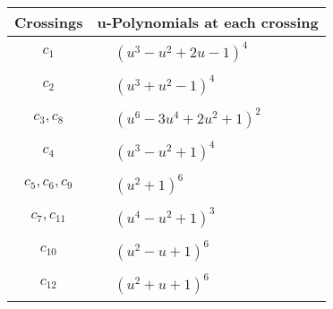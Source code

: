 \documentclass[1p]{elsarticle_modified}
\theoremstyle{definition}
\begin{document}
\begin{tabular}{m{50pt}|m{274pt}}
Crossings & \hspace{64pt}u-Polynomials at each crossing \\
\hline $$\begin{aligned}c_{1}\end{aligned}$$&$\begin{aligned}
&(u^3- u^2+2 u-1)^4
\end{aligned}$\\
\hline $$\begin{aligned}c_{2}\end{aligned}$$&$\begin{aligned}
&(u^3+u^2-1)^4
\end{aligned}$\\
\hline $$\begin{aligned}c_{3},c_{8}\end{aligned}$$&$\begin{aligned}
&(u^6-3 u^4+2 u^2+1)^2
\end{aligned}$\\
\hline $$\begin{aligned}c_{4}\end{aligned}$$&$\begin{aligned}
&(u^3- u^2+1)^4
\end{aligned}$\\
\hline $$\begin{aligned}c_{5},c_{6},c_{9}\end{aligned}$$&$\begin{aligned}
&(u^2+1)^6
\end{aligned}$\\
\hline $$\begin{aligned}c_{7},c_{11}\end{aligned}$$&$\begin{aligned}
&(u^4- u^2+1)^3
\end{aligned}$\\
\hline $$\begin{aligned}c_{10}\end{aligned}$$&$\begin{aligned}
&(u^2- u+1)^6
\end{aligned}$\\
\hline $$\begin{aligned}c_{12}\end{aligned}$$&$\begin{aligned}
&(u^2+u+1)^6
\end{aligned}$\\
\hline
\end{tabular}\\~\\
\end{document}
